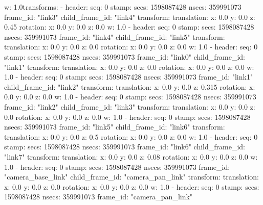         w: 1.0transforms: 
  - 
    header: 
      seq: 0
      stamp: 
        secs: 1598087428
        nsecs: 359991073
      frame_id: "link3"
    child_frame_id: "link4"
    transform: 
      translation: 
        x: 0.0
        y: 0.0
        z: 0.45
      rotation: 
        x: 0.0
        y: 0.0
        z: 0.0
        w: 1.0
  - 
    header: 
      seq: 0
      stamp: 
        secs: 1598087428
        nsecs: 359991073
      frame_id: "link4"
    child_frame_id: "link5"
    transform: 
      translation: 
        x: 0.0
        y: 0.0
        z: 0.0
      rotation: 
        x: 0.0
        y: 0.0
        z: 0.0
        w: 1.0
  - 
    header: 
      seq: 0
      stamp: 
        secs: 1598087428
        nsecs: 359991073
      frame_id: "link0"
    child_frame_id: "link1"
    transform: 
      translation: 
        x: 0.0
        y: 0.0
        z: 0.0
      rotation: 
        x: 0.0
        y: 0.0
        z: 0.0
        w: 1.0
  - 
    header: 
      seq: 0
      stamp: 
        secs: 1598087428
        nsecs: 359991073
      frame_id: "link1"
    child_frame_id: "link2"
    transform: 
      translation: 
        x: 0.0
        y: 0.0
        z: 0.315
      rotation: 
        x: 0.0
        y: 0.0
        z: 0.0
        w: 1.0
  - 
    header: 
      seq: 0
      stamp: 
        secs: 1598087428
        nsecs: 359991073
      frame_id: "link2"
    child_frame_id: "link3"
    transform: 
      translation: 
        x: 0.0
        y: 0.0
        z: 0.0
      rotation: 
        x: 0.0
        y: 0.0
        z: 0.0
        w: 1.0
  - 
    header: 
      seq: 0
      stamp: 
        secs: 1598087428
        nsecs: 359991073
      frame_id: "link5"
    child_frame_id: "link6"
    transform: 
      translation: 
        x: 0.0
        y: 0.0
        z: 0.5
      rotation: 
        x: 0.0
        y: 0.0
        z: 0.0
        w: 1.0
  - 
    header: 
      seq: 0
      stamp: 
        secs: 1598087428
        nsecs: 359991073
      frame_id: "link6"
    child_frame_id: "link7"
    transform: 
      translation: 
        x: 0.0
        y: 0.0
        z: 0.08
      rotation: 
        x: 0.0
        y: 0.0
        z: 0.0
        w: 1.0
  - 
    header: 
      seq: 0
      stamp: 
        secs: 1598087428
        nsecs: 359991073
      frame_id: "camera_base_link"
    child_frame_id: "camera_pan_link"
    transform: 
      translation: 
        x: 0.0
        y: 0.0
        z: 0.0
      rotation: 
        x: 0.0
        y: 0.0
        z: 0.0
        w: 1.0
  - 
    header: 
      seq: 0
      stamp: 
        secs: 1598087428
        nsecs: 359991073
      frame_id: "camera_pan_link"

